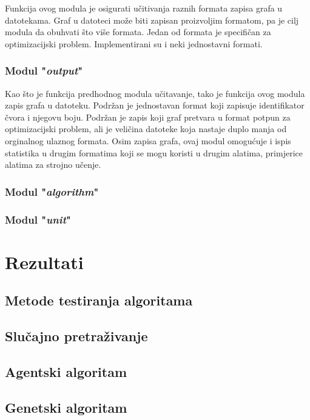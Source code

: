 \documentclass[times, utf8, diplomski, numeric]{fer}
\begin{document}
Funkcija ovog modula je osigurati učitivanja raznih formata zapisa grafa u datotekama. Graf u datoteci može biti zapisan proizvoljim formatom, pa je cilj modula da obuhvati što više formata. Jedan od formata je specifičan za optimizacijski problem. Implementirani su i neki jednostavni formati. 

\subsection{Modul "\emph{output}"}

Kao što je funkcija predhodnog modula učitavanje, tako je funkcija ovog modula zapis grafa u datoteku. Podržan je jednostavan format koji zapisuje identifikator čvora i njegovu boju. Podržan je zapis koji graf pretvara u format potpun za optimizacijski problem, ali je veličina datoteke koja nastaje duplo manja od orginalnog ulaznog formata. Osim zapisa grafa, ovaj modul omogućuje i ispis statistika u drugim formatima koji se mogu koristi u drugim alatima, primjerice alatima za strojno učenje.

\subsection{Modul "\emph{algorithm}"}

\subsection{Modul "\emph{unit}"}

\chapter{Rezultati}

\section{Metode testiranja algoritama}
\section{Slučajno pretraživanje}
\section{Agentski algoritam}

\section{Genetski algoritam}
\end{document}
